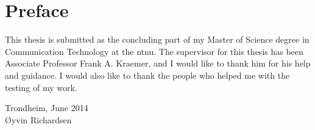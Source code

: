 \chapter*{Preface}

This thesis is submitted as the concluding part of my Master of Science degree in Communication Technology at the \gls{ntnu}. The supervisor for this thesis has been Associate Professor Frank A. Kraemer, and I would like to thank him for his help and guidance. I would also like to thank the people who helped me with the testing of my work.

\noindent
Trondheim, June 2014 \\
{\O}yvin Richardsen
